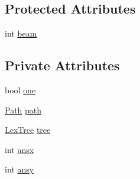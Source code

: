 \subsection*{Protected Attributes}
\begin{DoxyCompactItemize}
\item 
int \hyperlink{class_spell_checker_acaf7176c06b86947773cbb83d7574783}{beam}
\end{DoxyCompactItemize}
\subsection*{Private Attributes}
\begin{DoxyCompactItemize}
\item 
bool \hyperlink{class_spell_checker_a95d95e0ded8b4e1493a406746e509866}{one}
\item 
\hyperlink{struct_path}{Path} \hyperlink{class_spell_checker_aff173fdb5d93d05cd3c130f8a5267272}{path}
\item 
\hyperlink{class_lex_tree}{Lex\+Tree} \hyperlink{class_spell_checker_abe9e58ca9de98d9a1182612a3c10a5aa}{tree}
\item 
int \hyperlink{class_spell_checker_a7c04bca12734e76005fe2535a3698ea5}{ansx}
\item 
int \hyperlink{class_spell_checker_aca76cb3fc436ef3970a100a950c4f11a}{ansy}
\end{DoxyCompactItemize}


